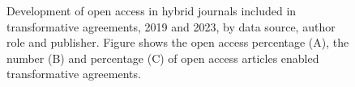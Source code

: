 \documentclass[a4paper,man,floatsintext,longtable,noextraspace,10pt]{apa6}
\begin{document}
\begin{figure}[ht!]


\caption{\label{fig-uptake_publisher}Development of open access in
hybrid journals included in transformative agreements, 2019 and 2023, by
data source, author role and publisher. Figure shows the open access
percentage (A), the number (B) and percentage (C) of open access
articles enabled transformative agreements.}

\end{figure}%
\end{document}
